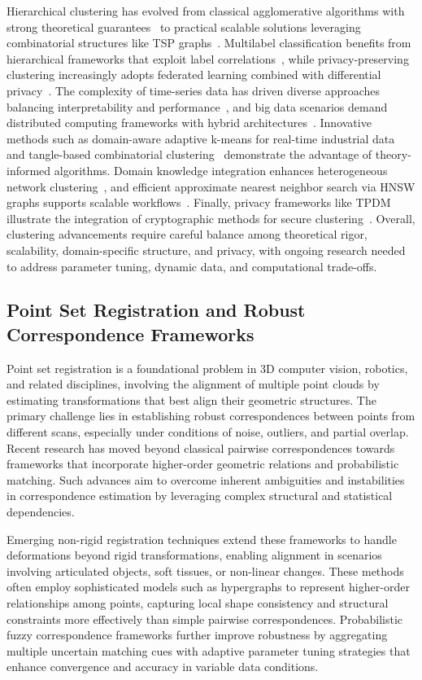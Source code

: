 \documentclass[sigconf]{acmart}
\begin{document}
Hierarchical clustering has evolved from classical agglomerative algorithms with strong theoretical guarantees~\cite{ref12} to practical scalable solutions leveraging combinatorial structures like TSP graphs~\cite{ref21}. Multilabel classification benefits from hierarchical frameworks that exploit label correlations~\cite{ref17}, while privacy-preserving clustering increasingly adopts federated learning combined with differential privacy~\cite{ref22}. The complexity of time-series data has driven diverse approaches balancing interpretability and performance~\cite{ref23}, and big data scenarios demand distributed computing frameworks with hybrid architectures~\cite{ref16}. Innovative methods such as domain-aware adaptive k-means for real-time industrial data~\cite{ref20} and tangle-based combinatorial clustering~\cite{ref13} demonstrate the advantage of theory-informed algorithms. Domain knowledge integration enhances heterogeneous network clustering~\cite{ref14}, and efficient approximate nearest neighbor search via HNSW graphs supports scalable workflows~\cite{ref4}. Finally, privacy frameworks like TPDM illustrate the integration of cryptographic methods for secure clustering~\cite{ref22,ref25}. Overall, clustering advancements require careful balance among theoretical rigor, scalability, domain-specific structure, and privacy, with ongoing research needed to address parameter tuning, dynamic data, and computational trade-offs.

\subsection{Point Set Registration and Robust Correspondence Frameworks}

Point set registration is a foundational problem in 3D computer vision, robotics, and related disciplines, involving the alignment of multiple point clouds by estimating transformations that best align their geometric structures. The primary challenge lies in establishing robust correspondences between points from different scans, especially under conditions of noise, outliers, and partial overlap. Recent research has moved beyond classical pairwise correspondences towards frameworks that incorporate higher-order geometric relations and probabilistic matching. Such advances aim to overcome inherent ambiguities and instabilities in correspondence estimation by leveraging complex structural and statistical dependencies.

Emerging non-rigid registration techniques extend these frameworks to handle deformations beyond rigid transformations, enabling alignment in scenarios involving articulated objects, soft tissues, or non-linear changes. These methods often employ sophisticated models such as hypergraphs to represent higher-order relationships among points, capturing local shape consistency and structural constraints more effectively than simple pairwise correspondences. Probabilistic fuzzy correspondence frameworks further improve robustness by aggregating multiple uncertain matching cues with adaptive parameter tuning strategies that enhance convergence and accuracy in variable data conditions.
\end{document}
